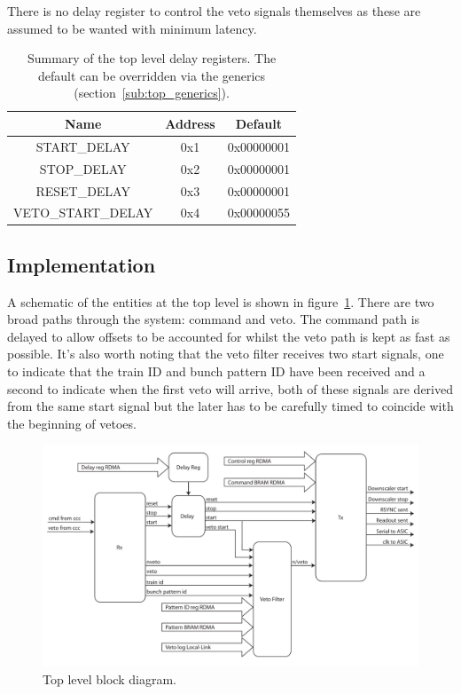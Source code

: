 There is no delay register to control the veto signals themselves as these are assumed to be wanted with minimum latency.
    
\begin{table}[htbp]
  \begin{center}
    \begin{tabular}{c | c | c }
      Name               & Address & Default    \\
      \hline
      START\_DELAY       & 0x1     & 0x00000001 \\
      STOP\_DELAY        & 0x2     & 0x00000001 \\
      RESET\_DELAY       & 0x3     & 0x00000001 \\
      VETO\_START\_DELAY & 0x4     & 0x00000055 \\
    \end{tabular}
  \end{center}
  \caption{Summary of the top level delay registers. The default can be overridden via the generics (section~\ref{sub:top_generics}).}
  \label{tab:delay_regs}
\end{table}
\subsection{Implementation} %
\label{sub:top_implementation}
A schematic of the entities at the top level is shown in figure~\ref{fig:ccc_interface_entity}. There are two broad paths through the system: command and veto. The command path is delayed to allow offsets to be accounted for whilst the veto path is kept as fast as possible. It's also worth noting that the veto filter receives two start signals, one to indicate that the train ID and bunch pattern ID have been received and a second to indicate when the first veto will arrive, both of these signals are derived from the same start signal but the later has to be carefully timed to coincide with the beginning of vetoes.
    
\begin{figure}[htbp]
  \centering
  \includegraphics[width=\textwidth]{images/pdfs/ccc_interface_block.pdf}
  \caption{Top level block diagram.}
  \label{fig:ccc_interface_entity}
\end{figure}
    
